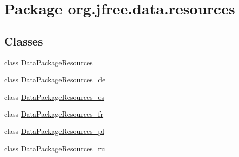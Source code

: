 \hypertarget{namespaceorg_1_1jfree_1_1data_1_1resources}{}\section{Package org.\+jfree.\+data.\+resources}
\label{namespaceorg_1_1jfree_1_1data_1_1resources}
\subsection*{Classes}
\begin{DoxyCompactItemize}
\item 
class \mbox{\hyperlink{classorg_1_1jfree_1_1data_1_1resources_1_1_data_package_resources}{Data\+Package\+Resources}}
\item 
class \mbox{\hyperlink{classorg_1_1jfree_1_1data_1_1resources_1_1_data_package_resources__de}{Data\+Package\+Resources\+\_\+de}}
\item 
class \mbox{\hyperlink{classorg_1_1jfree_1_1data_1_1resources_1_1_data_package_resources__es}{Data\+Package\+Resources\+\_\+es}}
\item 
class \mbox{\hyperlink{classorg_1_1jfree_1_1data_1_1resources_1_1_data_package_resources__fr}{Data\+Package\+Resources\+\_\+fr}}
\item 
class \mbox{\hyperlink{classorg_1_1jfree_1_1data_1_1resources_1_1_data_package_resources__pl}{Data\+Package\+Resources\+\_\+pl}}
\item 
class \mbox{\hyperlink{classorg_1_1jfree_1_1data_1_1resources_1_1_data_package_resources__ru}{Data\+Package\+Resources\+\_\+ru}}
\end{DoxyCompactItemize}
